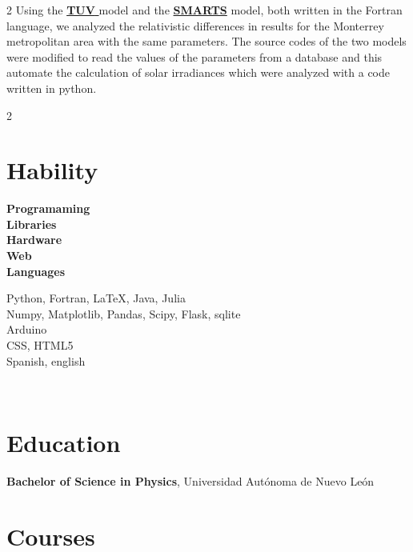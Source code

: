 \documentclass[a3paper,16pt]{adcv}
\newcommand*{\tuv}{\href{https://www2.acom.ucar.edu/modeling/tropospheric-ultraviolet-and-visible-tuv-radiation-model}{\textbf{TUV }}}
\begin{document}
\begin{multicols}{2}
    Using the \tuv model and the
    \href{https://www.nrel.gov/grid/solar-resource/smarts.html}{\textbf{SMARTS}} model, both written in the Fortran language, we analyzed the relativistic differences in
      results for the Monterrey metropolitan area with the same parameters. The source codes of the two models were modified to read the values of the parameters 
      from a database and this automate the calculation of solar irradiances which were analyzed with a code written in python.
  \end{multicols}
  \begin{multicols}{2}

\section{Hability}

\begin{minipage}{0.25\linewidth}
  \begin{flushright}
    \textbf{Programaming}\\
    \textbf{Libraries}
    \vspace{0.4cm}\\
    \textbf{Hardware}\\
    \textbf{Web}\\
    \textbf{Languages}
  \end{flushright}
\end{minipage}
\hspace{0.3cm}
\begin{minipage}{0.75\linewidth}
  \vspace{0.25cm}
  Python, Fortran, LaTeX, Java, Julia\\
  Numpy, Matplotlib, Pandas, Scipy, Flask, sqlite\\
  Arduino\\
  CSS, HTML5\\
  Spanish, english
\end{minipage}
\vspace{2cm}\\
\section{Education}

\textbf{Bachelor of Science in Physics}, Universidad Autónoma de Nuevo León\\

\section{Courses}


\end{multicols}
\end{document}
